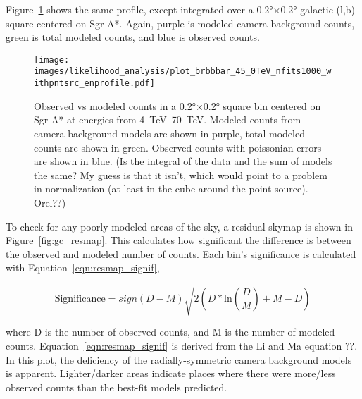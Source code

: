   Figure~\ref{fig:gc_profile_energy} shows the same profile, except integrated over a \ang{0.2}$\times$\ang{0.2} galactic (l,b) square centered on Sgr A*.
  Again, purple is modeled camera-background counts, green is total modeled counts, and blue is observed counts.
  
  \begin{figure}[h]
    \centering
    \texttt{[image: images/likelihood\_analysis/plot\_brbbbar\_45\_0TeV\_nfits1000\_withpntsrc\_enprofile.pdf]}
    \caption[Galactic Center Profile vs Energy]{
      Observed vs modeled counts in a \ang{0.2}$\times$\ang{0.2} square bin centered on Sgr A* at energies from \SIrange{4}{70}{TeV}.
      Modeled counts from camera background models are shown in purple, total modeled counts are shown in green.
      Observed counts with poissonian errors are shown in blue.
      {\color{red}(Is the integral of the data and the sum of models the same? My guess is that it isn't, which would point to a problem in normalization (at least in the cube around the point source). --Orel??)}
    }
    \label{fig:gc_profile_energy}
  \end{figure}
  
  To check for any poorly modeled areas of the sky, a residual skymap is shown in Figure~\ref{fig:gc_resmap}.
  This calculates how significant the difference is between the observed and modeled number of counts.
  Each bin's significance is calculated with Equation~\ref{eqn:resmap_signif},
  
  \begin{equation}\label{eqn:resmap_signif}
    \text{Significance} = sign(D-M) \sqrt{ 2 \left ( D * \textrm{ln} \left ( \frac{D}{M} \right ) + M - D \right ) }
  \end{equation}
  
  where D is the number of observed counts, and M is the number of modeled counts.
  Equation~\ref{eqn:resmap_signif} is derived from the Li and Ma {\color{red}equation ??}. 
  In this plot, the deficiency of the radially-symmetric camera background models is apparent.
  Lighter/darker areas indicate places where there were more/less observed counts than the best-fit models predicted.
  
